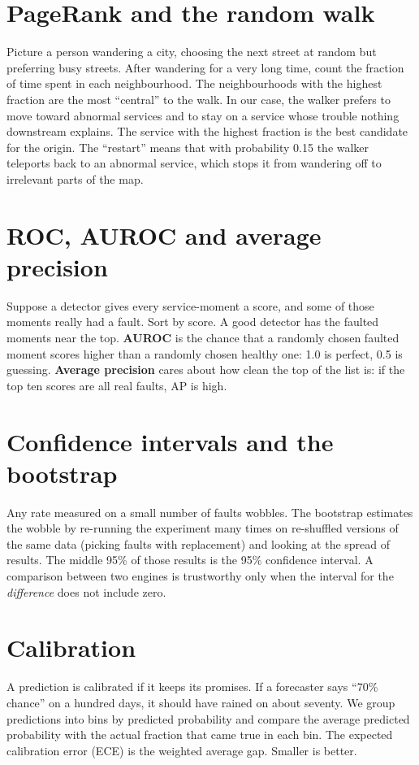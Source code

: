 \section{PageRank and the random walk}
\begin{simplebox}
Picture a person wandering a city, choosing the next street at random but preferring busy streets. After wandering for a very long time, count the fraction of time spent in each neighbourhood. The neighbourhoods with the highest fraction are the most ``central'' to the walk. In our case, the walker prefers to move toward abnormal services and to stay on a service whose trouble nothing downstream explains. The service with the highest fraction is the best candidate for the origin. The ``restart'' means that with probability 0.15 the walker teleports back to an abnormal service, which stops it from wandering off to irrelevant parts of the map.
\end{simplebox}

\section{ROC, AUROC and average precision}
\begin{simplebox}
Suppose a detector gives every service-moment a score, and some of those moments really had a fault. Sort by score. A good detector has the faulted moments near the top. \textbf{AUROC} is the chance that a randomly chosen faulted moment scores higher than a randomly chosen healthy one: 1.0 is perfect, 0.5 is guessing. \textbf{Average precision} cares about how clean the top of the list is: if the top ten scores are all real faults, AP is high.
\end{simplebox}

\section{Confidence intervals and the bootstrap}
\begin{simplebox}
Any rate measured on a small number of faults wobbles. The bootstrap estimates the wobble by re-running the experiment many times on re-shuffled versions of the same data (picking faults with replacement) and looking at the spread of results. The middle 95\% of those results is the 95\% confidence interval. A comparison between two engines is trustworthy only when the interval for the \emph{difference} does not include zero.
\end{simplebox}

\section{Calibration}
\begin{simplebox}
A prediction is calibrated if it keeps its promises. If a forecaster says ``70\% chance'' on a hundred days, it should have rained on about seventy. We group predictions into bins by predicted probability and compare the average predicted probability with the actual fraction that came true in each bin. The expected calibration error (ECE) is the weighted average gap. Smaller is better.
\end{simplebox}
